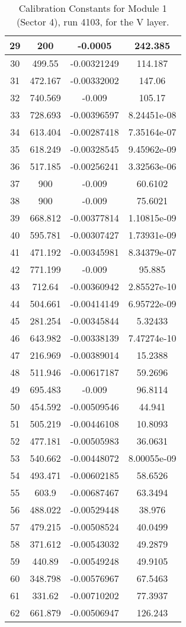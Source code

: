 \begin{table}[h]
{\begin{tabular}{|c|c|c|c|}
29	&	200	&	-0.0005	&	242.385	\\	\hline
30	&	499.55	&	-0.00321249	&	114.187	\\	\hline
31	&	472.167	&	-0.00332002	&	147.06	\\	\hline
32	&	740.569	&	-0.009	&	105.17	\\	\hline
33	&	728.693	&	-0.00396597	&	8.24451e-08	\\	\hline
34	&	613.404	&	-0.00287418	&	7.35164e-07	\\	\hline
35	&	618.249	&	-0.00328545	&	9.45962e-09	\\	\hline
36	&	517.185	&	-0.00256241	&	3.32563e-06	\\	\hline
37	&	900	&	-0.009	&	60.6102	\\	\hline
38	&	900	&	-0.009	&	75.6021	\\	\hline
39	&	668.812	&	-0.00377814	&	1.10815e-09	\\	\hline
40	&	595.781	&	-0.00307427	&	1.73931e-09	\\	\hline
41	&	471.192	&	-0.00345981	&	8.34379e-07	\\	\hline
42	&	771.199	&	-0.009	&	95.885	\\	\hline
43	&	712.64	&	-0.00360942	&	2.85527e-10	\\	\hline
44	&	504.661	&	-0.00414149	&	6.95722e-09	\\	\hline
45	&	281.254	&	-0.00345844	&	5.32433	\\	\hline
46	&	643.982	&	-0.00338139	&	7.47274e-10	\\	\hline
47	&	216.969	&	-0.00389014	&	15.2388	\\	\hline
48	&	511.946	&	-0.00617187	&	59.2696	\\	\hline
49	&	695.483	&	-0.009	&	96.8114	\\	\hline
50	&	454.592	&	-0.00509546	&	44.941	\\	\hline
51	&	505.219	&	-0.00446108	&	10.8093	\\	\hline
52	&	477.181	&	-0.00505983	&	36.0631	\\	\hline
53	&	540.662	&	-0.00448072	&	8.00055e-09	\\	\hline
54	&	493.471	&	-0.00602185	&	58.6526	\\	\hline
55	&	603.9	&	-0.00687467	&	63.3494	\\	\hline
56	&	488.022	&	-0.00529448	&	38.976	\\	\hline
57	&	479.215	&	-0.00508524	&	40.0499	\\	\hline
58	&	371.612	&	-0.00543032	&	49.2879	\\	\hline
59	&	440.89	&	-0.00549248	&	49.9105	\\	\hline
60	&	348.798	&	-0.00576967	&	67.5463	\\	\hline
61	&	331.62	&	-0.00710202	&	77.3937	\\	\hline
62	&	661.879	&	-0.00506947	&	126.243	\\	\hline
        \end{tabular}
        }
        \caption{Calibration Constants for Module 1 (Sector 4), run 4103, for the V layer.}
\end{table}



